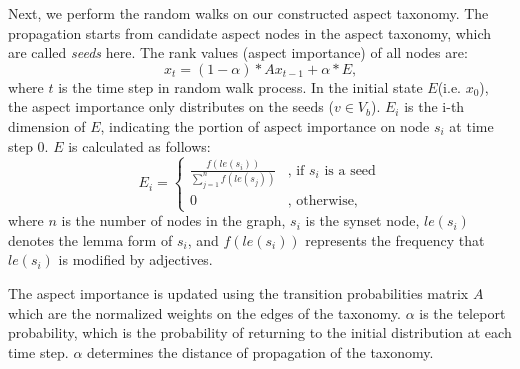 Next, we perform the random walks on our constructed
aspect taxonomy.
The propagation starts from candidate aspect nodes in the 
aspect taxonomy, which are called {\em seeds} here.
%
The rank values (aspect importance) of all nodes are:
\begin{equation}
x_t = (1-\alpha)*Ax_{t-1} + \alpha*E \text{,}
\label{eq:ppr}
\end{equation}
where $t$ is the time step in random walk process.
In the initial state $E$(i.e. $x_0$), the aspect importance only distributes on the seeds ($v\in V_b$). 
$E_i$ is the i-th dimension of $E$, indicating
the portion of aspect importance on node $s_i$ 
at time step 0.
$E$ is calculated as follows:
\begin{equation}
E_i = 
\begin{cases}
\frac{f(le(s_i))}{\sum_{j=1}^{n} f(le(s_j))} &  \text{, if $s_i$ is a seed} \\
0 &  \text{, otherwise,}
\end{cases}
\end{equation}
where $n$ is the number of nodes in the graph,
$s_i$ is the synset node,
$le(s_i)$ denotes the lemma form of $s_i$,
and $f(le(s_i))$ represents the frequency that 
$le(s_i)$ is modified by adjectives.

The aspect importance is updated using the transition probabilities matrix 
$A$ which are the normalized weights on the edges of the taxonomy. 
$\alpha$ is the teleport probability, which is 
the probability of returning to the initial distribution
at each time step. 
$\alpha$ determines the distance of propagation of the taxonomy. 


